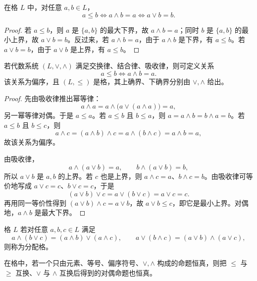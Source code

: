 \begin{theorem}[偏序与格运算的互相刻画]\label{order-lattice-ops}
  在格 $L$ 中，对任意 $a,b\in L$，
  \[
  a\le b\Longleftrightarrow a\wedge b=a
  \Longleftrightarrow a\vee b=b.
  \]
\end{theorem}

\begin{proof}
  若 $a\le b$，则 $a$ 是 $\{a,b\}$ 的最大下界，故 $a\wedge b=a$；同时 $b$ 是 $\{a,b\}$ 的最小上界，故 $a\vee b=b$。反过来，若 $a\wedge b=a$，由于 $a\wedge b$ 是下界，有 $a\le b$。若 $a\vee b=b$，由于 $a\vee b$ 是上界，有 $a\le b$。
\end{proof}

\begin{theorem}[代数定义的格]\label{lattice-algebraic}
  若代数系统 $(L,\vee,\wedge)$ 满足交换律、结合律、吸收律，则可定义关系
  \[
  a\le b\Longleftrightarrow a\wedge b=a.
  \]
  该关系为偏序，且 $(L,\le)$ 是格，其上确界、下确界分别由 $\vee,\wedge$ 给出。
\end{theorem}

\begin{proof}
  先由吸收律推出幂等律：
  \[
  a\wedge a=a\wedge\bigl(a\vee(a\wedge a)\bigr)=a,
  \]
  另一幂等律对偶。于是 $a\le a$。若 $a\le b$ 且 $b\le a$，则
  $a=a\wedge b=b\wedge a=b$。若 $a\le b$ 且 $b\le c$，则
  \[
  a\wedge c=(a\wedge b)\wedge c=a\wedge(b\wedge c)=a\wedge b=a,
  \]
  故该关系为偏序。

  由吸收律，
  \[
  a\wedge(a\vee b)=a,\qquad b\wedge(a\vee b)=b,
  \]
  所以 $a\vee b$ 是 $a,b$ 的上界。若 $c$ 也是上界，则
  $a\wedge c=a$、$b\wedge c=b$。由吸收律可等价地写成
  $a\vee c=c$、$b\vee c=c$，于是
  \[
  (a\vee b)\vee c=a\vee(b\vee c)=a\vee c=c.
  \]
  再用同一等价性得到 $(a\vee b)\wedge c=a\vee b$，故
  $a\vee b\le c$，即它是最小上界。对偶地，$a\wedge b$ 是最大下界。
\end{proof}

\begin{definition}[分配格]\label{distributive-lattice}
  格 $L$ 若对任意 $a,b,c\in L$ 满足
  \[
  a\wedge(b\vee c)=(a\wedge b)\vee(a\wedge c),
  \qquad
  a\vee(b\wedge c)=(a\vee b)\wedge(a\vee c),
  \]
  则称为分配格。
\end{definition}

\begin{theorem}[格的对偶原理]\label{lattice-duality}
  在格中，若一个只由元素、等号、偏序符号、$\vee,\wedge$ 构成的命题恒真，则把 $\le$ 与 $\ge$ 互换、$\vee$ 与 $\wedge$ 互换后得到的对偶命题也恒真。
\end{theorem}


